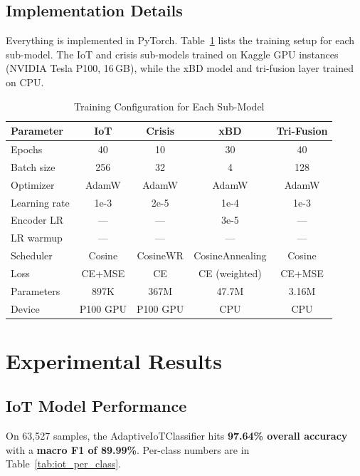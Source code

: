 \documentclass[journal]{IEEEtran}
\begin{document}
\subsection{Implementation Details}

Everything is implemented in PyTorch. Table~\ref{tab:training_config} lists the training setup for each sub-model. The IoT and crisis sub-models trained on Kaggle GPU instances (NVIDIA Tesla P100, 16\,GB), while the xBD model and tri-fusion layer trained on CPU.

\begin{table}[!t]
\centering
\caption{Training Configuration for Each Sub-Model}
\label{tab:training_config}
\begin{tabular}{lcccc}
\toprule
\textbf{Parameter} & \textbf{IoT} & \textbf{Crisis} & \textbf{xBD} & \textbf{Tri-Fusion} \\
\midrule
Epochs & 40 & 10 & 30 & 40 \\
Batch size & 256 & 32 & 4 & 128 \\
Optimizer & AdamW & AdamW & AdamW & AdamW \\
Learning rate & 1e-3 & 2e-5 & 1e-4 & 1e-3 \\
Encoder LR & --- & --- & 3e-5 & --- \\
LR warmup & --- & --- & --- & --- \\
Scheduler & Cosine & CosineWR & CosineAnnealing & Cosine \\
Loss & CE+MSE & CE & CE (weighted) & CE+MSE \\
Parameters & 897K & 367M & 47.7M & 3.16M \\
Device & P100 GPU & P100 GPU & CPU & CPU \\
\bottomrule
\end{tabular}
\end{table}

\section{Experimental Results}

\subsection{IoT Model Performance}

On 63,527 samples, the AdaptiveIoTClassifier hits \textbf{97.64\% overall accuracy} with a \textbf{macro F1 of 89.99\%}. Per-class numbers are in Table~\ref{tab:iot_per_class}.
\end{document}
